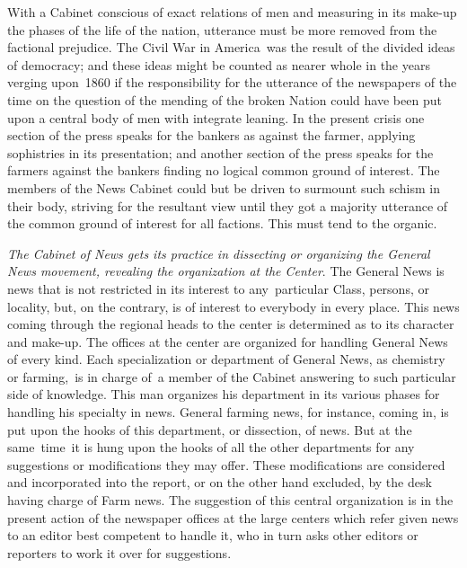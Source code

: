 \documentclass[twoside,symmetric,nobib,justified]{tufte-book}
\begin{document}
With a Cabinet conscious of exact relations of men and measuring in its
make-up the phases of the life of the nation, utterance must be more
removed from the factional prejudice. The Civil War in America~was the
result of the divided ideas of democracy; and these ideas might be
counted as nearer whole in the years verging upon~1860 if the
responsibility for the utterance of the newspapers of the time on the
question of the mending of the broken Nation could have been put upon a
central body of men with integrate leaning. In the present crisis one
section of the press speaks for the bankers as against the farmer,
applying sophistries in its presentation; and another section of the
press speaks for the farmers against the bankers finding no logical
common ground of interest. The members of the News Cabinet could but be
driven to surmount such schism in their body, striving for the resultant
view until they got a majority utterance of the common ground of
interest for all factions. This must tend to the organic.~

\vspace{0.05in}

\emph{The Cabinet of News gets its practice in dissecting or organizing
the General News movement, revealing the organization at the Center}.
The General News is news that is not restricted in its interest to
any~particular Class, persons, or locality, but, on the contrary, is of
interest to everybody in every place. This news coming through the
regional heads to the center is determined as to its character and
make-up. The offices at the center are organized for handling General
News of every kind. Each specialization or department of General News,
as chemistry or farming,~is in charge of~a member of the Cabinet
answering to such particular side of knowledge. This man organizes his
department in its various phases for handling his specialty in news.
General farming news, for instance, coming in, is put upon the hooks of
this department, or dissection, of news. But at the same~time~it is hung
upon the hooks of all the other departments for any suggestions or
modifications they may offer. These modifications are considered and
incorporated into the report, or on the other hand excluded, by the desk
having charge of Farm news. The suggestion of this central organization
is in the present action of the newspaper offices at the large centers
which refer given news to an editor best competent to handle it, who in
turn asks other editors or reporters to work it over for suggestions.~
\end{document}
